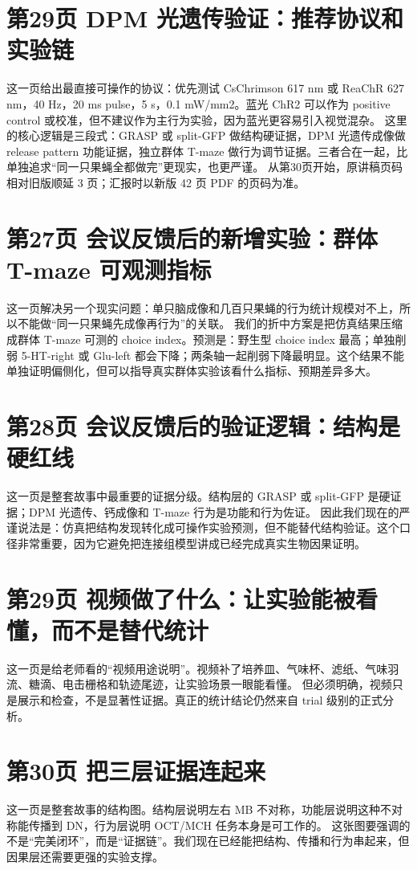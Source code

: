 \documentclass[11pt,fontset=none]{ctexart}
\begin{document}
\section*{第29页 DPM 光遗传验证：推荐协议和实验链}
这一页给出最直接可操作的协议：优先测试 CsChrimson 617 nm 或 ReaChR 627 nm，40 Hz，20 ms pulse，5 s，0.1 mW/mm2。蓝光 ChR2 可以作为 positive control 或校准，但不建议作为主行为实验，因为蓝光更容易引入视觉混杂。
这里的核心逻辑是三段式：GRASP 或 split-GFP 做结构硬证据，DPM 光遗传成像做 release pattern 功能证据，独立群体 T-maze 做行为调节证据。三者合在一起，比单独追求“同一只果蝇全都做完”更现实，也更严谨。
从第30页开始，原讲稿页码相对旧版顺延 3 页；汇报时以新版 42 页 PDF 的页码为准。
\section*{第27页 会议反馈后的新增实验：群体 T-maze 可观测指标}
这一页解决另一个现实问题：单只脑成像和几百只果蝇的行为统计规模对不上，所以不能做“同一只果蝇先成像再行为”的关联。
我们的折中方案是把仿真结果压缩成群体 T-maze 可测的 choice index。预测是：野生型 choice index 最高；单独削弱 5-HT-right 或 Glu-left 都会下降；两条轴一起削弱下降最明显。这个结果不能单独证明偏侧化，但可以指导真实群体实验该看什么指标、预期差异多大。
\section*{第28页 会议反馈后的验证逻辑：结构是硬红线}
这一页是整套故事中最重要的证据分级。结构层的 GRASP 或 split-GFP 是硬证据；DPM 光遗传、钙成像和 T-maze 行为是功能和行为佐证。
因此我们现在的严谨说法是：仿真把结构发现转化成可操作实验预测，但不能替代结构验证。这个口径非常重要，因为它避免把连接组模型讲成已经完成真实生物因果证明。
\section*{第29页 视频做了什么：让实验能被看懂，而不是替代统计}
这一页是给老师看的“视频用途说明”。视频补了培养皿、气味杯、滤纸、气味羽流、糖滴、电击栅格和轨迹尾迹，让实验场景一眼能看懂。
但必须明确，视频只是展示和检查，不是显著性证据。真正的统计结论仍然来自 trial 级别的正式分析。
\section*{第30页 把三层证据连起来}
这一页是整套故事的结构图。结构层说明左右 MB 不对称，功能层说明这种不对称能传播到 DN，行为层说明 OCT/MCH 任务本身是可工作的。
这张图要强调的不是“完美闭环”，而是“证据链”。我们现在已经能把结构、传播和行为串起来，但因果层还需要更强的实验支撑。
\end{document}
